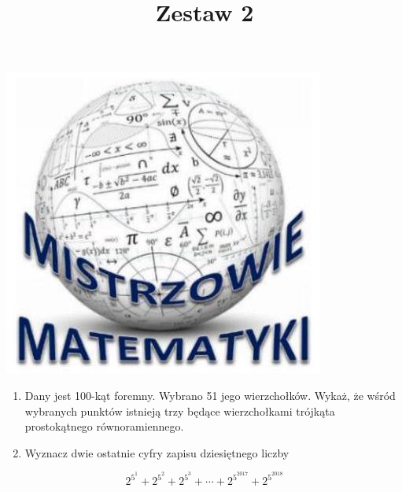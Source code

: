 \documentclass[10pt]{article}
\title{Zestaw 2 }
\author{}
\date{}
\begin{document}
\maketitle
\begin{center}
\includegraphics[max width=\textwidth]{2024_11_21_388519d38d11b6d14f67g-1}
\end{center}

\begin{enumerate}
  \item Dany jest 100-kąt foremny. Wybrano 51 jego wierzchołków. Wykaż, że wśród wybranych punktów istnieją trzy będące wierzchołkami trójkąta prostokątnego równoramiennego.
  \item Wyznacz dwie ostatnie cyfry zapisu dziesiętnego liczby
\end{enumerate}

\[
2^{5^{1}}+2^{5^{2}}+2^{5^{3}}+\cdots+2^{5^{2017}}+2^{5^{2018}}
\]
\end{document}
